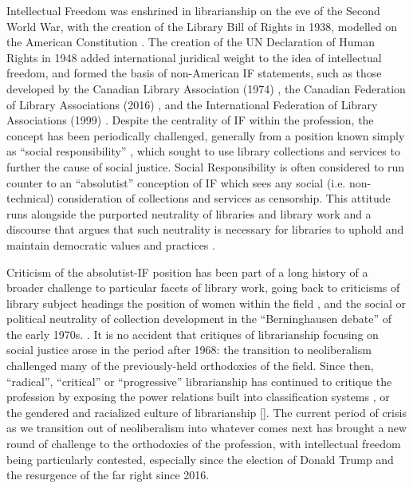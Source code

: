 \documentclass[12pt,oneside]{memoir}
\begin{document}
Intellectual Freedom was enshrined in librarianship on the eve of the Second World War, with the creation of the Library Bill of Rights in 1938, modelled on the American Constitution \cite[147-152]{samek-if1}. The creation of the UN Declaration of Human Rights in 1948 added international juridical weight to the idea of intellectual freedom, and formed the basis of non-American IF statements, such as those developed by the Canadian Library Association (1974) \cite{cla-if}, the Canadian Federation of Library Associations (2016) \cite{cfla-if}, and the International Federation of Library Associations (1999) \cite{ifla-if}. Despite the centrality of IF within the profession, the concept has been periodically challenged, generally from a position known simply as ``social responsibility'' \cite{samek-if1}, which sought to use library collections and services to further the cause of social justice. Social Responsibility is often considered to run counter to an ``absolutist'' conception of IF \cite[89]{gorman-2000} which sees any social (i.e. non-technical) consideration of collections and services as censorship. This attitude runs alongside the purported neutrality of libraries and library work \cite{lewis-2008} and a discourse that argues that such neutrality is necessary for libraries to uphold and maintain democratic values and practices \cite{popowich-2019}.

Criticism of the absolutist-IF position has been part of a long history of a broader challenge to particular facets of library work, going back to criticisms of library subject headings \cite{berman-1971} the position of women within the field \cite{garrison-1972}, and the social or political neutrality of collection development in the ``Berninghausen debate'' of the early 1970s. \cite[4-5]{samek-if1}. It is no accident that critiques of librarianship focusing on social justice arose in the period after 1968: the transition to neoliberalism challenged many of the previously-held orthodoxies of the field. Since then, ``radical'', ``critical'' or ``progressive'' librarianship has continued to critique the profession by exposing the power relations built into classification systems \cite{olson-2002}, or the gendered and racialized culture of librarianship [\cite{lew-yousefi-2017, schlesselman-tarango-2017, chou-pho-2018}]. The current period of crisis as we transition out of neoliberalism into whatever comes next has brought a new round of challenge to the orthodoxies of the profession, with intellectual freedom being particularly contested, especially since the election of Donald Trump and the resurgence of the far right since 2016. 
\end{document}
